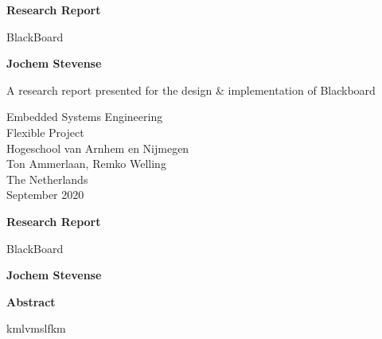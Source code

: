 \documentclass[a4paper,12pt]{article}
\begin{document}
\begin{titlepage}
  \begin{center}
    \vspace*{1cm}

    \Huge
    \textbf{Research Report}

    \vspace{0.5cm}
    \LARGE
    BlackBoard

    \vspace{1.5cm}

    \textbf{Jochem Stevense}

    \vfill

    A research report presented for the design \& implementation of Blackboard

    \vspace{0.8cm}


    \Large
    Embedded Systems Engineering\\
    Flexible Project\\
    Hogeschool van Arnhem en Nijmegen\\
    Ton Ammerlaan, Remko Welling\\
    The Netherlands\\
    September 2020\\
  \end{center}
\end{titlepage}

\thispagestyle{plain}
\begin{center}
    \Large
    \textbf{Research Report}
        
    \vspace{0.4cm}
    \large
    BlackBoard
        
    \vspace{0.4cm}
    \textbf{Jochem Stevense}
       
    \vspace{0.9cm}
    \textbf{Abstract}
  \end{center}
  kmlvmslfkm
  \newpage
\end{document}
